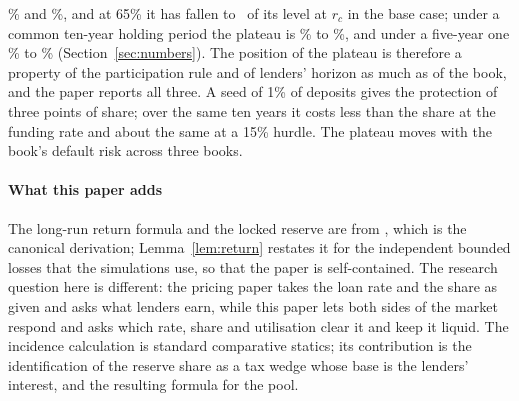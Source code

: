 \documentclass[preprint,11pt,authoryear]{elsarticle}
\theoremstyle{definition}
\begin{document}
\LoNinetyNine\% and \HiNinetyNine\%, and at 65\% it has fallen to \VSixtyFiveBase\ of its level at $r_c$
in the base case; under a common ten-year holding period the plateau is \LoNinetyNineHTen\% to
\HiNinetyNineHTen\%, and under a five-year one \LoNinetyNineHFive\% to \HiNinetyNineHFive\%
(Section~\ref{sec:numbers}). The position of the plateau is therefore a property of the participation
rule and of lenders' horizon as much as of the book, and the paper reports all three. A seed of 1\% of
deposits gives the protection of three points of share; over the same ten years it costs less than
the share at the funding rate and about the same at a 15\% hurdle. The plateau moves with the book's
default risk across three books.

\paragraph{What this paper adds} The long-run return formula and the locked reserve are from
\citet{pricingreserve2026}, which is the canonical derivation; Lemma~\ref{lem:return} restates it for
the independent bounded losses that the simulations use, so that the paper is self-contained. The
research question here is different: the pricing paper takes the loan rate and the share as given
and asks what lenders earn, while this paper lets both sides of the market respond and asks which
rate, share and utilisation clear it and keep it liquid. The incidence calculation is standard
comparative statics; its contribution is the identification of the reserve share as a tax wedge
whose base is the lenders' interest, and the resulting formula for the pool.
\end{document}

